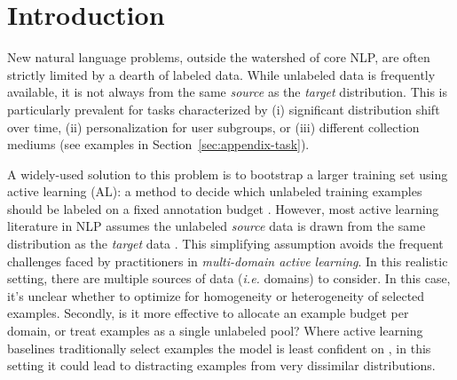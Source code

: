 


\respace
\section{Introduction}
\respace
\label{sec:introduction}

New natural language problems, outside the watershed of core NLP, are often strictly limited by a dearth of labeled data.
While unlabeled data is frequently available, it is not always from the same \emph{source} as the \emph{target} distribution.
This is particularly prevalent for tasks characterized by (i) significant distribution shift over time, (ii) personalization for user subgroups, or (iii) different collection mediums (see examples in Section~\ref{sec:appendix-task}).

A widely-used solution to this problem is to bootstrap a larger training set using active learning (AL): a method to decide which unlabeled training examples should be labeled on a fixed annotation budget \citep{cohn1996active, settles2012active}.
However, most active learning literature in NLP assumes the unlabeled \textit{source} data is drawn from the same distribution as the \textit{target} data \citep{dor2020active}.
This simplifying assumption avoids the frequent challenges faced by practitioners in \emph{multi-domain active learning}.
In this realistic setting, there are multiple sources of data (\emph{i.e.} domains) to consider.
In this case, it's unclear whether to optimize for homogeneity or heterogeneity of selected examples.
Secondly, is it more effective to allocate an example budget per domain, or treat examples as a single unlabeled pool?
Where active learning baselines traditionally select examples the model is least confident on \citep{settles2009active}, in this setting it could lead to distracting examples from very dissimilar distributions.

